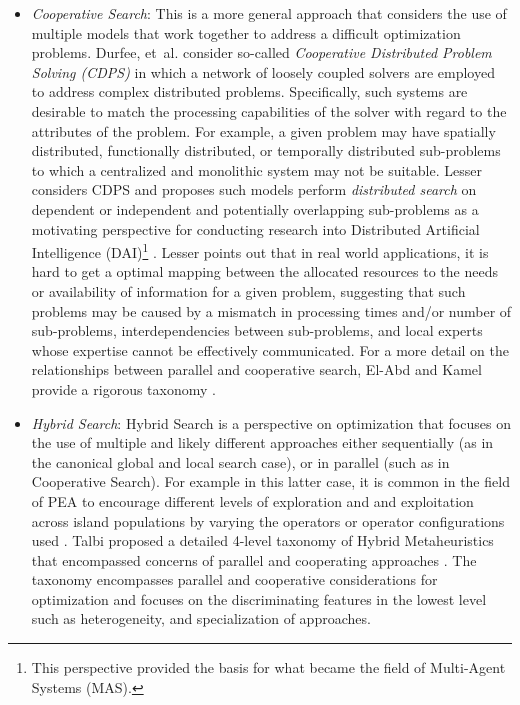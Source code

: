 \documentclass[a4paper, 11pt]{article}
\begin{document}
\begin{itemize}
	\item \emph{Cooperative Search}: This is a more general approach that considers the use of multiple models that work together to address a difficult optimization problems. Durfee, et~al. consider so-called \emph{Cooperative Distributed Problem Solving (CDPS)} in which a network of loosely coupled solvers are employed to address complex distributed problems. Specifically, such systems are desirable to match the processing capabilities of the solver with regard to the attributes of the problem. For example, a given problem may have spatially distributed, functionally distributed, or temporally distributed sub-problems to which a centralized and monolithic system may not be suitable. Lesser considers CDPS and proposes such models perform \emph{distributed search} on dependent or independent and potentially overlapping sub-problems as a motivating perspective for conducting research into Distributed Artificial Intelligence (DAI)\footnote{This perspective provided the basis for what became the field of Multi-Agent Systems (MAS).} \cite{Lesser1990}. Lesser points out that in real world applications, it is hard to get a optimal mapping between the allocated resources to the needs or availability of information for a given problem, suggesting that such problems may be caused by a mismatch in processing times and/or number of sub-problems, interdependencies between sub-problems, and local experts whose expertise cannot be effectively communicated. For a more detail on the relationships between parallel and cooperative search, El-Abd and Kamel provide a rigorous taxonomy \cite{El-Abd2005}.
	
	\item \emph{Hybrid Search}: Hybrid Search is a perspective on optimization that focuses on the use of multiple and likely different approaches either sequentially (as in the canonical global and local search case), or in parallel (such as in Cooperative Search). For example in this latter case, it is common in the field of PEA to encourage different levels of exploration and and exploitation across island populations by varying the operators or operator configurations used \cite{Tanese1989, Adamidis1996}. Talbi proposed a detailed 4-level taxonomy of Hybrid Metaheuristics that encompassed concerns of parallel and cooperating approaches \cite{Talbi2001}. The taxonomy encompasses parallel and cooperative considerations for optimization and focuses on the discriminating features in the lowest level such as heterogeneity, and specialization of approaches.
	

\end{itemize}
\end{document}

